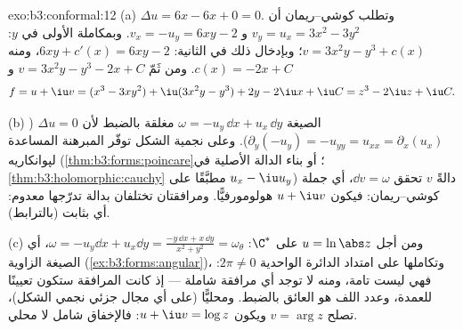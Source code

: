 \begin{solution}{exo:b3:conformal:12}
(a) $\Delta u = 6x - 6x + 0 = 0$. وتطلب كوشي--ريمان أن $v_y = u_x = 3x^2 - 3y^2$ و $v_x = -u_y = 6xy - 2$. وبمكاملة
الأولى في $y$: $v = 3x^2y - y^3 + c(x)$؛ وبإدخال ذلك في الثانية: $6xy + c'(x) = 6xy - 2$، ومنه
$c(x)
= -2x + C$. ومن ثَمّ $v = 3x^2y - y^3 - 2x + C$ و
\[
f = u + \iu v = (x^3 - 3xy^2) + \iu(3x^2y - y^3)
+ 2y - 2\iu x + \iu C = z^3 - 2\iu z + \iu C .
\]

(b) الصيغة $\omega = -u_y\,\dd x + u_x\,\dd y$ مغلقة بالضبط لأن $\Delta u = 0$ ($\partial_y(-u_y) =
-u_{yy} = u_{xx} = \partial_x(u_x)$).
وعلى  نجمية الشكل توفّر المبرهنة المساعدة
لپوانكاريه (\cref{thm:b3:forms:poincare}؛ أو بناء الدالة الأصلية في \cref{thm:b3:holomorphic:cauchy}
مطبَّقًا على  $u_x - \iu u_y$) دالةً $v$
تحقق $\dd v = \omega$، أي جملة كوشي--ريمان: فيكون $u + \iu v$
هولومورفيًّا. ومرافقتان تختلفان بدالة تدرّجها معدوم: أي بثابت
(بالترابط).

(c) ومن أجل $u = \ln\abs z$ على $\C^*$: $\omega = -u_y\dd x +
u_x\dd y = \frac{-y\,\dd x + x\,\dd y}{x^2 + y^2} =
\omega_\theta$، أي الصيغة
الزاوية (\cref{ex:b3:forms:angular})، وتكاملها على امتداد الدائرة الواحدية
$2\pi \neq 0$: فهي ليست تامة، ومنه لا توجد أي مرافقة شاملة ---
إذ كانت المرافقة ستكون تعيينًا  للعمدة، وعدد اللف هو
العائق بالضبط. ومحليًّا (على أي مجال جزئي نجمي الشكل)، تصلح
$v =
\arg z$ ويكون $u + \iu v = \log z$: فالإخفاق شامل لا محلي.
\end{solution}

